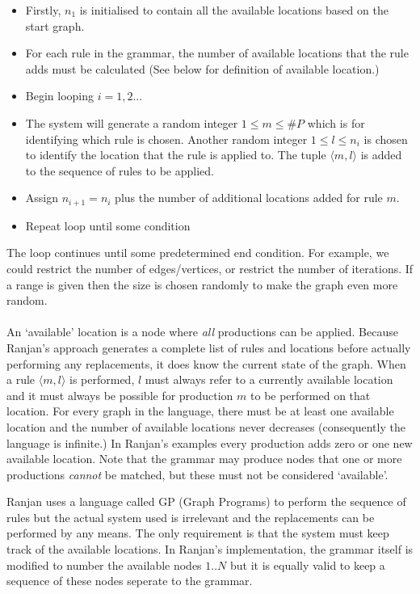   \begin{itemize}
  \item Firstly, $n_1$ is initialised to contain all the available locations based on the start graph.
  \item For each rule in the grammar, the number of available locations that the rule adds must be calculated (See below for definition of available location.)
  \item Begin looping $i = 1,2...$
  \item The system will generate a random integer $1 \leq m \leq \#P$ which is for identifying which rule is chosen. Another random integer $1 \leq l \leq n_i$ is chosen to identify the location that the rule is applied to. The tuple $\langle m,l \rangle$ is added to the sequence of rules to be applied.
  \item Assign $n_{i+1} = n_i$ plus the number of additional locations added for rule $m$. 
  \item Repeat loop until some condition
  \end{itemize}

  The loop continues until some predetermined end condition. For example, we could restrict the number of edges/vertices, or restrict the number of iterations. If a range is given then the size is chosen randomly to make the graph even more random.

  \paragraph{}

  An `available' location is a node where \emph{all} productions can be applied. Because Ranjan's approach generates a complete list of rules and locations before actually performing any replacements, it does know the current state of the graph. When a rule $\langle m,l \rangle$ is performed, $l$ must always refer to a currently available location and it must always be possible for production $m$ to be performed on that location. For every graph in the language, there must be at least one available location and the number of available locations never decreases (consequently the language is infinite.) In Ranjan's examples every production adds zero or one new available location. Note that the grammar may produce nodes that one or more productions \emph{cannot} be matched, but these must not be considered `available'.
  
  Ranjan uses a language called GP (Graph Programs) to perform the sequence of rules but the actual system used is irrelevant and the replacements can be performed by any means. The only requirement is that the system must keep track of the available locations. In Ranjan's implementation, the grammar itself is modified to number the available nodes $1..N$ but it is equally valid to keep a sequence of these nodes seperate to the grammar.

